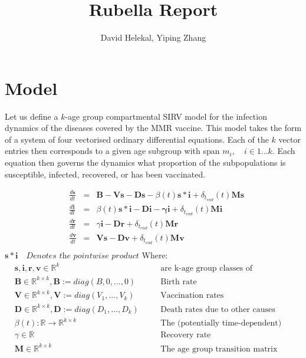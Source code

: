 \documentclass{article}
\title{Rubella Report}
\author{David Helekal, Yiping Zhang}
\begin{document}
\maketitle
\section{Model}

Let us define a $k$-age group compartmental SIRV model for the infection dynamics of the diseases covered by the MMR vaccine. This model takes the form of a system of four vectorised ordinary differential equations. Each of the $k$ vector entries then corresponds to a given age subgroup with span $m_i, \quad i\in1...k$. Each equation then governs the dynamics what proportion of the subpopulations is susceptible, infected, recovered, or has been vaccinated.

\begin{align*}
&\frac{d\mathbf{s}}{dt} &=& \mathbf{B} - \mathbf{V}\mathbf{s} - \mathbf{D}\mathbf{s} - \beta(t)\mathbf{s}*\mathbf
{i}+\delta_{t_{end}}(t)\mathbf{M}\mathbf{s}\\
&\frac{d\mathbf{i}}{dt} &=&\beta(t)\mathbf{s}*\mathbf{i} - \mathbf{D}\mathbf{i} - \mathbf{\gamma}\mathbf{i}+\delta_{t_{end}}(t)\mathbf{M}\mathbf{i}\\
&\frac{d\mathbf{r}}{dt} &=& \gamma\mathbf{i} - \mathbf{D}\mathbf{r}+\delta_{t_{end}}(t)\mathbf{M}\mathbf{r}\\
&\frac{d\mathbf{v}}{dt} &=& \mathbf{V}\mathbf{s}-\mathbf{D}\mathbf{v} +\delta_{t_{end}}(t)\mathbf{M}\mathbf{v}\\
\end{align*}
$\mathbf{s}*\mathbf{i}\quad\textit{Denotes the pointwise product}$
Where:
\begin{align*}
&\mathbf{s}, \mathbf{i}, \mathbf{r} ,\mathbf{v}\in \mathbb{R}^k& \quad& \text{are k-age group classes of susceptible, infected, recovered}\\
&\mathbf{B} \in \mathbb{R}^{k\times k}, \mathbf{B}:=diag(B,0,...,0)& \quad& \text{Birth rate}\\
&\mathbf{V} \in \mathbb{R}^{k\times k}, \mathbf{V}:=diag(V_1,...,V_k) &\quad& \text{Vaccination rates}\\
&\mathbf{D} \in \mathbb{R}^{k\times k}, \mathbf{D}:=diag(D_1,...,D_k) &\quad& \text{Death rates due to other causes}\\
&\beta(t):\mathbb{R} \rightarrow \mathbb{R}^{k\times k}&\quad& \text{The (potentially time-dependent) contact rate}\\
&\gamma \in \mathbb{R}&\quad&\text{Recovery rate}\\
&\mathbf{M}\in\mathbb{R}^{k\times k}&\quad& \text{The age group transition matrix}&
\end{align*}
\end{document}
